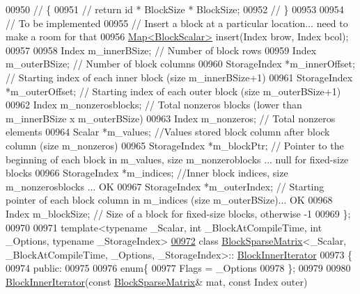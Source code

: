 \begin{DoxyCode}
00950 \textcolor{comment}{//    \{}
00951 \textcolor{comment}{//      return id * BlockSize * BlockSize;}
00952 \textcolor{comment}{//    \}}
00953 
00954     \textcolor{comment}{// To be implemented}
00955     \textcolor{comment}{// Insert a block at a particular location... need to make a room for that}
00956     \hyperlink{group___core___module_class_eigen_1_1_map}{Map<BlockScalar>} insert(Index brow, Index bcol);
00957 
00958     Index m\_innerBSize; \textcolor{comment}{// Number of block rows}
00959     Index m\_outerBSize; \textcolor{comment}{// Number of block columns}
00960     StorageIndex *m\_innerOffset; \textcolor{comment}{// Starting index of each inner block (size m\_innerBSize+1)}
00961     StorageIndex *m\_outerOffset; \textcolor{comment}{// Starting index of each outer block (size m\_outerBSize+1)}
00962     Index m\_nonzerosblocks; \textcolor{comment}{// Total nonzeros blocks (lower than  m\_innerBSize x m\_outerBSize)}
00963     Index m\_nonzeros; \textcolor{comment}{// Total nonzeros elements}
00964     Scalar *m\_values; \textcolor{comment}{//Values stored block column after block column (size m\_nonzeros)}
00965     StorageIndex *m\_blockPtr; \textcolor{comment}{// Pointer to the beginning of each block in m\_values, size m\_nonzeroblocks
       ... null for fixed-size blocks}
00966     StorageIndex *m\_indices; \textcolor{comment}{//Inner block indices, size m\_nonzerosblocks ... OK}
00967     StorageIndex *m\_outerIndex; \textcolor{comment}{// Starting pointer of each block column in m\_indices (size
       m\_outerBSize)... OK}
00968     Index m\_blockSize; \textcolor{comment}{// Size of a block for fixed-size blocks, otherwise -1}
00969 \};
00970 
00971 \textcolor{keyword}{template}<\textcolor{keyword}{typename} \_Scalar, \textcolor{keywordtype}{int} \_BlockAtCompileTime, \textcolor{keywordtype}{int} \_Options, \textcolor{keyword}{typename} \_StorageIndex>
\hyperlink{class_eigen_1_1_block_sparse_matrix_1_1_block_inner_iterator}{00972} \textcolor{keyword}{class }\hyperlink{group___sparse_core___module_class_eigen_1_1_block_sparse_matrix}{BlockSparseMatrix}<\_Scalar, \_BlockAtCompileTime, \_Options, \_StorageIndex>::
      \hyperlink{class_eigen_1_1_block_sparse_matrix_1_1_block_inner_iterator}{BlockInnerIterator}
00973 \{
00974   \textcolor{keyword}{public}:
00975 
00976     \textcolor{keyword}{enum}\{
00977       Flags = \_Options
00978     \};
00979 
00980     \hyperlink{class_eigen_1_1_block_sparse_matrix_1_1_block_inner_iterator}{BlockInnerIterator}(\textcolor{keyword}{const} \hyperlink{group___sparse_core___module_class_eigen_1_1_block_sparse_matrix}{BlockSparseMatrix}& mat, \textcolor{keyword}{const} Index outer)

\end{DoxyCode}
